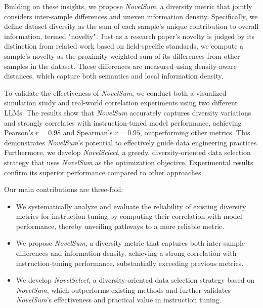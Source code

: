 Building on these insights, we propose \textit{NovelSum}, a diversity metric that jointly considers inter-sample differences and uneven information density. Specifically, we define dataset diversity as the sum of each sample's unique contribution to overall information, termed "novelty". Just as a research paper’s novelty is judged by its distinction from related work based on field-specific standards, we compute a sample's novelty as the proximity-weighted sum of its differences from other samples in the dataset. These differences are measured using density-aware distances, which capture both semantics and local information density.


To validate the effectiveness of \textit{NovelSum}, we conduct both a visualized simulation study and real-world correlation experiments using two different LLMs. 
The results show that \textit{NovelSum} accurately captures diversity variations and strongly correlates with instruction-tuned model performance, achieving Pearson's $r=0.98$ and Spearman's $r=0.95$, outperforming other metrics.
This demonstrates \textit{NovelSum}'s potential to effectively guide data engineering practices.
Furthermore, we develop \textit{NovelSelect}, a greedy, diversity-oriented data selection strategy that uses \textit{NovelSum} as the optimization objective. Experimental results confirm its superior performance compared to other approaches.



Our main contributions are three-fold:
\begin{itemize}
\item We systematically analyze and evaluate the reliability of existing diversity metrics for instruction tuning by computing their correlation with model performance, thereby unveiling pathways to a more reliable metric.
\item We propose \textit{NovelSum}, a diversity metric that captures both inter-sample differences and information density, achieving a strong correlation with instruction-tuning performance, substantially exceeding previous metrics.
\item We develop \textit{NovelSelect}, a diversity-oriented data selection strategy based on \textit{NovelSum}, which outperforms existing methods and further validates \textit{NovelSum}'s effectiveness and practical value in instruction tuning.

\end{itemize}












